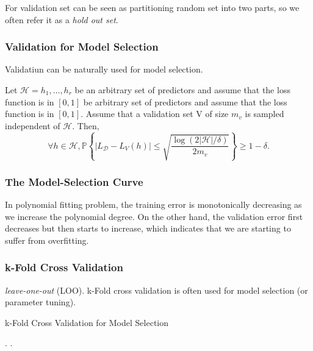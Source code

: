 For validation set can be seen as partitioning random set into two parts, so we often refer it as a \emph{hold out set}.

\subsubsection{Validation for Model Selection}

Validatiun can be naturally used for model selection.

\begin{thm}
	Let $ \mathcal{H} = {h_1, \dots, h_r}  $ be an arbitrary set of predictors and assume that the loss function is in $ [0, 1]  $ 
	be arbitrary set of predictors and assume that the loss function is in $ [0, 1]  $. Assume that a validation set V of size $ m_v $ 
	is sampled independent of $ \mathcal{H} $. Then, 
	\[ \forall h\in\mathcal{H}, \mathbb{P} \left\{ |L_\mathcal{D} - L_V(h)| \le 
	\sqrt {\frac{\log(2|\mathcal{H}|/\delta)}{2m_v}}  \right\} \ge 1-\delta.\]
\end{thm}

\subsubsection{The Model-Selection Curve}

In polynomial fitting problem, the training error is monotonically decreasing as we increase the polynomial degree.
On the other hand, the validation error first decreases but then starts to increase, 
which indicates that we are starting to suffer from overfitting.

\subsubsection{k-Fold Cross Validation}

\emph{leave-one-out} (LOO).
k-Fold cross validation is often used for model selection (or parameter tuning).

\begin{algorithm}[h!]
	\caption{k-Fold Cross Validation for Model Selection} 
	\begin{algorithmic}
		\For{$ \theta \in \Theta $ }
			\EndFor.
		\EndFor.
	\end{algorithmic}
\end{algorithm}

